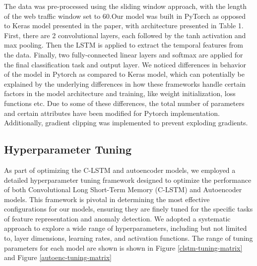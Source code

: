 \documentclass[10pt,twocolumn,letterpaper]{article}
\begin{document}
The data was pre-processed using the sliding window approach, with the length of the web traffic window set to 60.Our model was built in PyTorch as opposed to Keras model presented in the paper, 
with architecture presented in Table 1. First, there are 2 convolutional layers, each followed by the tanh activation and max pooling. Then the LSTM is applied to extract the temporal features from the data. 
Finally, two fully-connected linear layers and softmax are applied for the final classification task and output layer. We noticed differences in behavior of the model in Pytorch as compared to Keras model, 
which can potentially be explained by the underlying differences in how these frameworks handle certain factors in the model architecture and training, like weight initialization, loss functions etc. 
Due to some of these differences, the total number of parameters and certain attributes have been modified for Pytorch implementation. Additionally, gradient clipping was implemented to prevent exploding 
gradients. 

\subsection{Hyperparameter Tuning}
As part of optimizing the C-LSTM and autoencoder models, we employed a detailed hyperparameter tuning framework designed to optimize the performance of both Convolutional Long Short-Term Memory (C-LSTM) 
and Autoencoder models. This framework is pivotal in determining the most effective configurations for our models, ensuring they are finely tuned for the specific tasks of feature 
representation and anomaly detection. We adopted a systematic approach to explore a wide range of hyperparameters, including but not limited to, layer dimensions, learning rates, and activation functions. 
The range of tuning parameters for each model are shown is shown in Figure \ref*{clstm-tuning-matrix} and Figure \ref*{autoenc-tuning-matrix}
\end{document}
